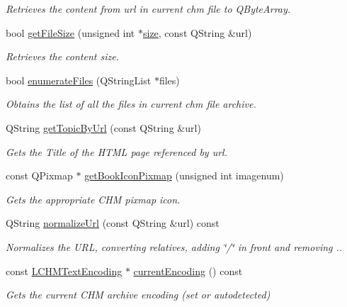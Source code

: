 \begin{DoxyCompactItemize}
\begin{DoxyCompactList}\small\item\em Retrieves the content from url in current chm file to Q\+Byte\+Array. \end{DoxyCompactList}\item 
bool \hyperlink{classLCHMFile_a2e4b934ed39c6f5f801423485a32b3e8}{get\+File\+Size} (unsigned int $\ast$\hyperlink{synctex__parser_8c_aa23c661441688350614bd6a350d2b6ff}{size}, const Q\+String \&url)
\begin{DoxyCompactList}\small\item\em Retrieves the content size. \end{DoxyCompactList}\item 
bool \hyperlink{classLCHMFile_af0dbccaf688f99e8c4519917159e8817}{enumerate\+Files} (Q\+String\+List $\ast$files)
\begin{DoxyCompactList}\small\item\em Obtains the list of all the files in current chm file archive. \end{DoxyCompactList}\item 
Q\+String \hyperlink{classLCHMFile_a4bb516986c667b9774e9d84700b96a00}{get\+Topic\+By\+Url} (const Q\+String \&url)
\begin{DoxyCompactList}\small\item\em Gets the Title of the H\+T\+M\+L page referenced by url. \end{DoxyCompactList}\item 
const Q\+Pixmap $\ast$ \hyperlink{classLCHMFile_a42b6781e6c3227656c9b6d12922fb522}{get\+Book\+Icon\+Pixmap} (unsigned int imagenum)
\begin{DoxyCompactList}\small\item\em Gets the appropriate C\+H\+M pixmap icon. \end{DoxyCompactList}\item 
Q\+String \hyperlink{classLCHMFile_a8c98d60af1fa1588548b99bbcd77b1e4}{normalize\+Url} (const Q\+String \&url) const 
\begin{DoxyCompactList}\small\item\em Normalizes the U\+R\+L, converting relatives, adding \char`\"{}/\char`\"{} in front and removing .. \end{DoxyCompactList}\item 
const \hyperlink{structLCHMTextEncoding}{L\+C\+H\+M\+Text\+Encoding} $\ast$ \hyperlink{classLCHMFile_a0847ee498ddb6e46c064cf0924868c01}{current\+Encoding} () const 
\begin{DoxyCompactList}\small\item\em Gets the current C\+H\+M archive encoding (set or autodetected) \end{DoxyCompactList}\item 

\end{DoxyCompactItemize}
